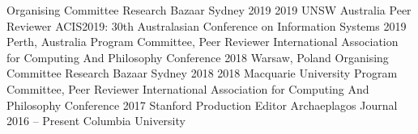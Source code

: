 
\begin{cventries}
\cventry
    {Organising Committee}
    {Research Bazaar Sydney 2019}
    {2019}
    {UNSW Australia}
    {}
\cventry
    {Peer Reviewer}
    {ACIS2019: 30th Australasian Conference on Information Systems}
    {2019}
    {Perth, Australia}
    {}
\cventry
    {Program Committee, Peer Reviewer}
    {International Association for Computing And Philosophy Conference}
    {2018}
    {Warsaw, Poland}
    {}    
\cventry
    {Organising Committee}
    {Research Bazaar Sydney 2018}
    {2018}
    {Macquarie University}
    {}    
\cventry
    {Program Committee, Peer Reviewer}
    {International Association for Computing And Philosophy Conference}
    {2017}
    {Stanford}
    {}
\cventry
    {Production Editor}
    {Archaeplagos Journal}
    {2016 -- Present}
    {Columbia University}
    {}    
\end{cventries}


